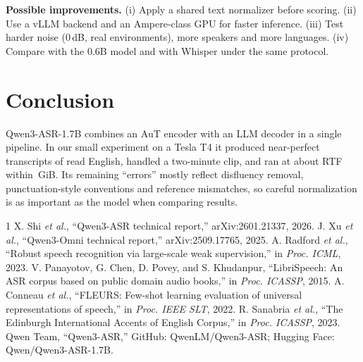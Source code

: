 \documentclass[conference]{IEEEtran}
\begin{document}
\textbf{Possible improvements.} (i) Apply a shared text normalizer before scoring. (ii) Use a vLLM backend and an Ampere-class GPU for faster inference. (iii) Test harder noise (0\,dB, real environments), more speakers and more languages. (iv) Compare with the 0.6B model and with Whisper under the same protocol.

\section{Conclusion}
Qwen3-ASR-1.7B combines an AuT encoder with an LLM decoder in a single pipeline. In our small experiment on a Tesla T4 it produced near-perfect transcripts of read English, handled a two-minute clip, and ran at about \meanrtf{} RTF within \vrampeak\,GiB. Its remaining ``errors'' mostly reflect disfluency removal, punctuation-style conventions and reference mismatches, so careful normalization is as important as the model when comparing results.

\begin{thebibliography}{1}
 X. Shi \emph{et al.}, ``Qwen3-ASR technical report,'' arXiv:2601.21337, 2026.
 J. Xu \emph{et al.}, ``Qwen3-Omni technical report,'' arXiv:2509.17765, 2025.
 A. Radford \emph{et al.}, ``Robust speech recognition via large-scale weak supervision,'' in \emph{Proc. ICML}, 2023.
 V. Panayotov, G. Chen, D. Povey, and S. Khudanpur, ``LibriSpeech: An ASR corpus based on public domain audio books,'' in \emph{Proc. ICASSP}, 2015.
 A. Conneau \emph{et al.}, ``FLEURS: Few-shot learning evaluation of universal representations of speech,'' in \emph{Proc. IEEE SLT}, 2022.
 R. Sanabria \emph{et al.}, ``The Edinburgh International Accents of English Corpus,'' in \emph{Proc. ICASSP}, 2023.
 Qwen Team, ``Qwen3-ASR,'' GitHub: QwenLM/Qwen3-ASR; Hugging Face: Qwen/Qwen3-ASR-1.7B.
\end{thebibliography}
\end{document}
